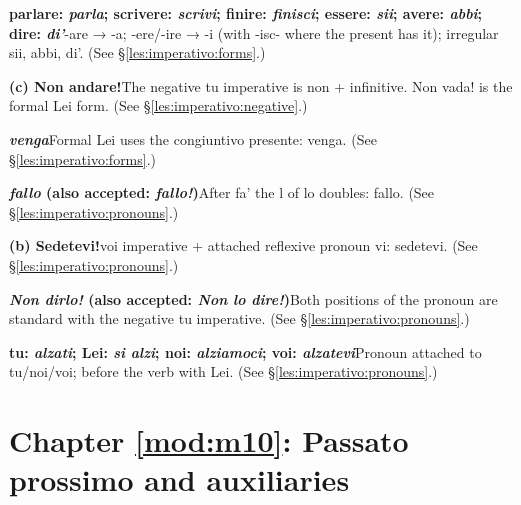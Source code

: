 \documentclass[11pt,a4paper,twoside,openright]{book}
\newcommand{\answerheading}[1]{\par\medskip\noindent{\sffamily\bfseries\small #1}\par\nopagebreak}
\begin{document}
\answerheading{\S\ref{les:imperativo} The imperative}\label{ans:imperativo}
\begin{answers}
\item\relax \textbf{parlare: \textit{parla}; scrivere: \textit{scrivi}; finire: \textit{finisci}; essere: \textit{sii}; avere: \textit{abbi}; dire: \textit{di'}}\newline -are → -a; -ere/-ire → -i (with -isc- where the present has it); irregular sii, abbi, di'. {\color{muted}(See \S\ref{les:imperativo:forms}.)}
\item\relax \textbf{(c) Non andare!}\newline The negative tu imperative is non + infinitive. Non vada! is the formal Lei form. {\color{muted}(See \S\ref{les:imperativo:negative}.)}
\item\relax \textbf{\textit{venga}}\newline Formal Lei uses the congiuntivo presente: venga. {\color{muted}(See \S\ref{les:imperativo:forms}.)}
\item\relax \textbf{\textit{fallo} {\color{muted}(also accepted: \textit{fallo!})}}\newline After fa' the l of lo doubles: fallo. {\color{muted}(See \S\ref{les:imperativo:pronouns}.)}
\item\relax \textbf{(b) Sedetevi!}\newline voi imperative + attached reflexive pronoun vi: sedetevi. {\color{muted}(See \S\ref{les:imperativo:pronouns}.)}
\item\relax \textbf{\textit{Non dirlo!} {\color{muted}(also accepted: \textit{Non lo dire!})}}\newline Both positions of the pronoun are standard with the negative tu imperative. {\color{muted}(See \S\ref{les:imperativo:pronouns}.)}
\item\relax \textbf{tu: \textit{alzati}; Lei: \textit{si alzi}; noi: \textit{alziamoci}; voi: \textit{alzatevi}}\newline Pronoun attached to tu/noi/voi; before the verb with Lei. {\color{muted}(See \S\ref{les:imperativo:pronouns}.)}
\end{answers}

\section*{Chapter \ref{mod:m10}: Passato prossimo and auxiliaries}
\end{document}
